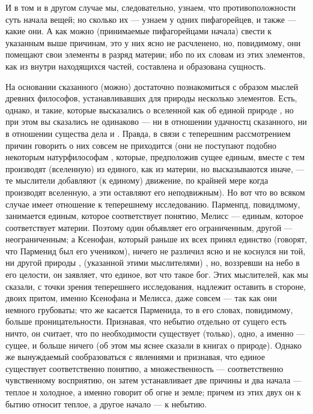 \documentclass{article}
\begin{document}
{И в том и в другом случае мы, следовательно, узнаем, что противоположности суть начала вещей; но сколько их — узнаем у одних пифагорейцев, и также — какие они. А как можно (принимаемые пифагорейцами начала) свести к указанным выше причинам, это у них
\footnotemark[5]
ясно не расчленено, но, повидимому, они помещают свои элементы в разряд материи; ибо по их словам из этих элементов, как из внутри находящихся частей, составлена и образована сущность.

На основании сказанного (можно) достаточно познакомиться с образом мыслей древних философов, устанавливавших для природы несколько элементов. Есть, однако, и такие, которые высказались о вселенной как об единой природе , но при этом вы сказались не одинаково — ни в отношении удачностц сказанного, ни в отношении существа дела и . Правда, в связи с теперешним рассмотрением причин говорить о них совсем не приходится (они не поступают подобно некоторым натурфилософам , которые, предположив сущее единым, вместе с тем производят (вселенную) из единого, как из материи, но высказываются иначе, — те мыслители добавляют (к единому) движение, по крайней мере когда производят вселенную, а эти оставляют его неподвижным). Но вот что во всяком случае имеет отношение к теперешнему исследованию. Парменпд, повидлмому, занимается единым, которое соответствует понятию,
\footnotemark[6]
Мелисс — единым, которое соответствует материи. Поэтому один объявляет его ограниченным, другой — неограниченным; а Ксенофан, который раньше их всех принял единство (говорят, что Парменид был его учеником), ничего не различил ясно и не коснулся ни той, ни другой природы , (указанной этими мыслителями) , но, воззревши на небо в его целости, он заявляет, что единое, вот что такое бог. Этих мыслителей, как мы сказали, с точки зрения теперешнего исследования, надлежит оставить в стороне, двоих притом, именно Ксенофана и Мелисса, даже совсем — так как они немного грубоваты; что же касается Парменида, то в его словах, повидимому, больше проницательности. Признавая, что небытио отдельно от сущего есть ничто, он считает, что по необходимости существует (только), одно, а именно — сущее, и больше ничего (об этом мы яснее сказали в книгах о природе).
\footnotemark[7]
Однако же вынуждаемый сообразоваться с явлениями и признавая, что единое существует соответственно понятию, а множественность — соответственно чувственному восприятию, он затем устанавливает две причины и два начала — теплое н холодное, а именно говорит об огне и земле; причем из этих двух он к бытию относит теплое, а другое начало — к небытию.

}
\end{document}

